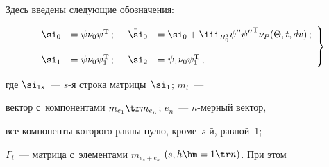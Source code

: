 Здесь введены следующие обозначения:

  \begin{equation}

  \left.

  \begin{array}{rlrl}

    \si_0&=\psi\nu_0\psi^{\mathrm{T}}\,; &\enskip 

    \bar \si_0 &= \displaystyle\si_0 +\iii_{R_0^q} \psi'' {\psi''}^{\mathrm{T}} \nu_P (\Theta, t, dv)\,;

\\[14pt]

 \si_1&=\psi\nu_0\psi_1^{\mathrm{T}}\,;&\enskip

    \si_2&=\psi_1\nu_0\psi_1^{\mathrm{T}}\,,

    \end{array}

    \right\}

    \label{e3.11-s1}

    \end{equation}

где  $\si_{1s}$~--- $s$-я строка матрицы~$\si_1$; $m_t$~--- 

вектор с~компонентами  $m_{e_1} \tr m_{e_n}$; $e_n$~--- $n$-мер\-ный вектор, 

все компоненты которого равны нулю, кроме~$s$-й, равной~1; 

$\Gamma_t$~--- матрица с~элементами $m_{e_s+e_h}$ $(s,h \hm= 1\tr n)$. При этом

